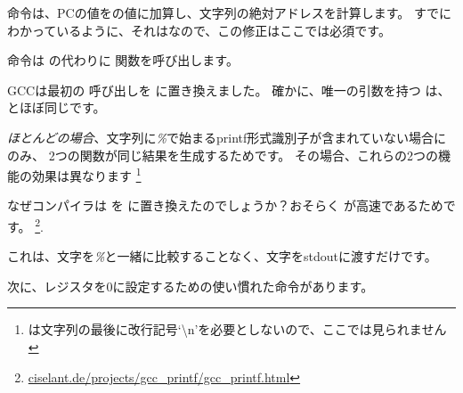 命令は、\ac{PC}の値をの値に加算し、文字列の絶対アドレスを計算します。 
すでにわかっているように、それはなので、この修正はここでは必須です。

命令は \printf の代わりに \puts 関数を呼び出します。

\label{puts}

GCCは最初の \printf 呼び出しを \puts に置き換えました。 
確かに、唯一の引数を持つ \printf は、 \puts とほぼ同じです。

\emph{ほとんどの場合}、文字列に\emph{\%}で始まるprintf形式識別子が含まれていない場合にのみ、
2つの関数が同じ結果を生成するためです。 その場合、これらの2つの機能の効果は異なります
\footnote{ \puts は文字列の最後に改行記号`\textbackslash{}n'を必要としないので、ここでは見られません}

なぜコンパイラは \printf を \puts に置き換えたのでしょうか？おそらく \puts が高速であるためです。
\footnote{\href{http://go.yurichev.com/17063}{ciselant.de/projects/gcc\_printf/gcc\_printf.html}}. 

これは、文字を\emph{\%}と一緒に比較することなく、文字を\gls{stdout}に渡すだけです。

次に、レジスタを0に設定するための使い慣れた命令があります。
